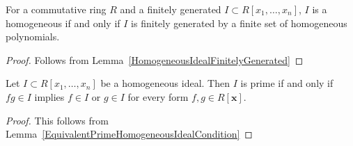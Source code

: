\begin{lemma}\label{HomogeneousIdealsAreGeneratedByForms}
    For a commutative ring $R$ and a finitely generated $I\subset R[x_1,\dots,x_n]$, $I$ is a homogeneous if and only if $I$ is finitely generated by a finite set of homogeneous polynomials. 
\end{lemma}
\begin{proof}
    Follows from Lemma~\ref{HomogeneousIdealFinitelyGenerated}
\end{proof}
\begin{lemma}\label{CheckingHomogeneousIdealPrimeSufficesToCheckForms}
    Let $I\subset R[x_1,\dots,x_n]$ be a homogeneous ideal. Then $I$ is prime if and only if $fg\in I$ implies $f\in I$ or $g\in I$ for every form $f,g\in R[\mathbf{x}]$. 
\end{lemma}
\begin{proof}
    This follows from Lemma~\ref{EquivalentPrimeHomogeneousIdealCondition}
\end{proof} 
